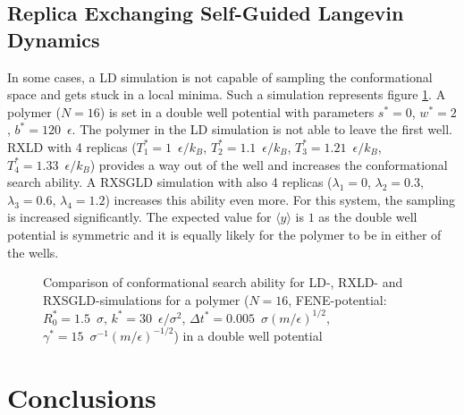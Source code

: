 \documentclass[a4paper]{article}
\begin{document}
\subsection{Replica Exchanging Self-Guided Langevin Dynamics}

In some cases, a LD simulation is not capable of sampling the conformational space and gets stuck in a local minima. Such a simulation represents figure \ref{im:comparison_rxld_rxsgld}. A polymer ($N = 16$) is set in a double well potential with parameters $s^* = 0$, $w^* = 2$, $b^* = 120 \enspace \epsilon$. The polymer in the LD simulation is not able to leave the first well. RXLD with 4 replicas ($T_1^* = 1 \enspace \epsilon/k_B$, $T_2^* = 1.1 \enspace \epsilon/k_B$, $T_3^* = 1.21 \enspace \epsilon/k_B$, $T_4^* = 1.33 \enspace \epsilon/k_B$) provides a way out of the well and increases the conformational search ability. A RXSGLD simulation with also 4 replicas ($\lambda_1 = 0$, $\lambda_2 = 0.3$, $\lambda_3 = 0.6$, $\lambda_4 = 1.2$) increases this ability even more. For this system, the sampling is increased significantly. The expected value for $\langle y \rangle$ is $1$ as the double well potential is symmetric and it is equally likely for the polymer to be in either of the wells.

\begin{figure} [H]
\centering

\caption{Comparison of conformational search ability for LD-, RXLD- and RXSGLD-simulations for a polymer ($N = 16$, FENE-potential: $R_0^* = 1.5 \enspace \sigma$, $k^* = 30 \enspace \epsilon/\sigma^2$, $\Delta t^* = 0.005 \enspace \sigma (m/\epsilon)^{1/2}$, $\gamma^* = 15 \enspace \sigma^{-1} (m/\epsilon)^{-1/2}$) in a double well potential}
\label{im:comparison_rxld_rxsgld}
\end{figure}

\section{Conclusions}
\end{document}
